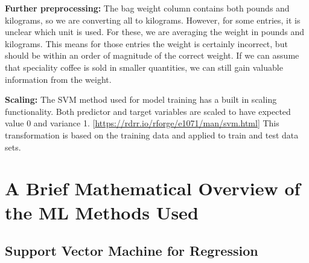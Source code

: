 \documentclass[
]{article}
\begin{document}
\textbf{Further preprocessing:} The bag weight column contains both
pounds and kilograms, so we are converting all to kilograms. However,
for some entries, it is unclear which unit is used. For these, we are
averaging the weight in pounds and kilograms. This means for those
entries the weight is certainly incorrect, but should be within an order
of magnitude of the correct weight. If we can assume that speciality
coffee is sold in smaller quantities, we can still gain valuable
information from the weight.

\textbf{Scaling:} The SVM method used for model training has a built in
scaling functionality. Both predictor and target variables are scaled to
have expected value 0 and variance 1.
{[}\url{https://rdrr.io/rforge/e1071/man/svm.html}{]} This
transformation is based on the training data and applied to train and
test data sets.

\section{A Brief Mathematical Overview of the ML Methods
Used}\label{a-brief-mathematical-overview-of-the-ml-methods-used}

\subsection{Support Vector Machine for
Regression}\label{support-vector-machine-for-regression}
\end{document}
